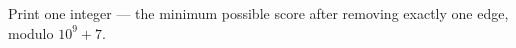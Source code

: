 Print one integer --- the minimum possible score after removing exactly one edge, modulo $10^9 + 7$.